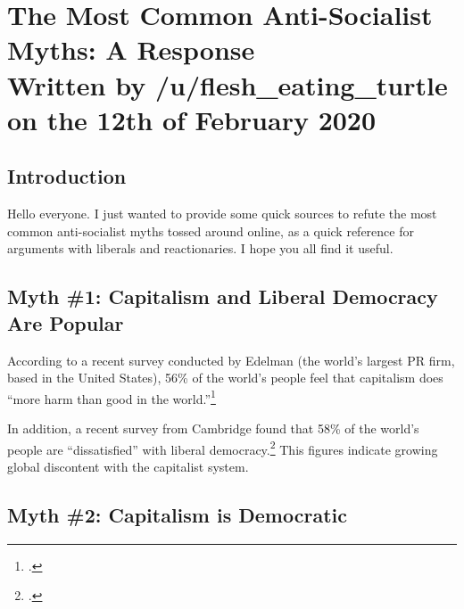 \section[The Most Common Anti-Socialist Myths]{The Most Common Anti-Socialist Myths: A Response\\\small{Written by /u/flesh\_eating\_turtle on the 12th of February 2020}}
\subsection*{Introduction}

Hello everyone.
I just wanted to provide some quick sources to refute the most common anti-socialist myths tossed around online, as a quick reference for arguments with liberals and reactionaries.
I hope you all find it useful.

\subsection*{Myth \#1: Capitalism and Liberal Democracy Are Popular}

According to a recent survey conducted by Edelman (the world's largest PR firm, based in the United States), 56\% of the world's people feel that capitalism does ``more harm than good in the world.''\footcite{john-capitalism}

In addition, a recent survey from Cambridge found that 58\% of the world's people are ``dissatisfied'' with liberal democracy.\footcite{cambridge}
This figures indicate growing global discontent with the capitalist system.

\subsection*{Myth \#2: Capitalism is Democratic}

